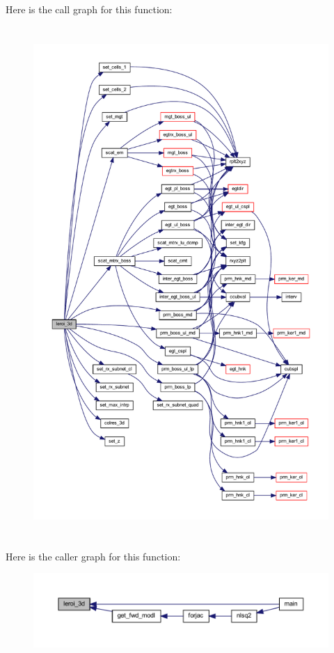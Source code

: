 Here is the call graph for this function\+:\nopagebreak
\begin{figure}[H]
\begin{center}
\leavevmode
\includegraphics[height=550pt]{Leroi_8f90_ad3c98b0aa8032dd5e2c3fce9417d4512_cgraph}
\end{center}
\end{figure}
Here is the caller graph for this function\+:\nopagebreak
\begin{figure}[H]
\begin{center}
\leavevmode
\includegraphics[width=350pt]{Leroi_8f90_ad3c98b0aa8032dd5e2c3fce9417d4512_icgraph}
\end{center}
\end{figure}
\mbox{\label{Leroi_8f90_accb3ec8ce6fe855a60b0c1959fc6e2c8}} 
